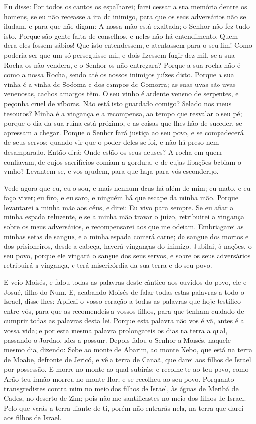 Eu disse: Por todos os cantos os espalharei; farei cessar a sua
memória dentre os homens, se eu não receasse a ira do
inimigo, para que os seus adversários não se iludam, e para que não
digam: A nossa mão está exaltada; o Senhor não fez tudo isto.
Porque são gente falta de conselhos, e neles não há
entendimento. Quem dera eles fossem sábios! Que isto
entendessem, e atentassem para o seu fim! Como poderia ser
que um só perseguisse mil, e dois fizessem fugir dez mil, se a sua
Rocha os não vendera, e o Senhor os não entregara? Porque a
sua rocha não é como a nossa Rocha, sendo até os nossos inimigos
juízes disto. Porque a sua vinha é a vinha de Sodoma e dos
campos de Gomorra; as suas uvas são uvas venenosas, cachos amargos
têm. O seu vinho é ardente veneno de serpentes, e peçonha
cruel de víboras. Não está isto guardado comigo? Selado nos
meus tesouros? Minha é a vingança e a recompensa, ao tempo
que resvalar o seu pé; porque o dia da sua ruína está próximo, e as
coisas que lhes hão de suceder, se apressam a chegar. Porque
o Senhor fará justiça ao seu povo, e se compadecerá de seus servos;
quando vir que o poder deles se foi, e não há preso nem desamparado.
Então dirá: Onde estão os seus deuses? A rocha em quem
confiavam, de cujos sacrifícios comiam a gordura, e de cujas
libações bebiam o vinho? Levantem-se, e vos ajudem, para que haja
para vós esconderijo.

Vede agora que eu, eu o sou, e mais nenhum deus há além de mim;
eu mato, e eu faço viver; eu firo, e eu saro, e ninguém há que
escape da minha mão. Porque levantarei a minha mão aos céus,
e direi: Eu vivo para sempre. Se eu afiar a minha espada
reluzente, e se a minha mão travar o juízo, retribuirei a vingança
sobre os meus adversários, e recompensarei aos que me odeiam.
Embriagarei as minhas setas de sangue, e a minha espada
comerá carne; do sangue dos mortos e dos prisioneiros, desde a
cabeça, haverá vinganças do inimigo. Jubilai, ó nações, o seu
povo, porque ele vingará o sangue dos seus servos, e sobre os seus
adversários retribuirá a vingança, e terá misericórdia da sua terra
e do seu povo.

E veio Moisés, e falou todas as palavras deste cântico aos
ouvidos do povo, ele e Josué, filho do Num. E, acabando
Moisés de falar todas estas palavras a todo o Israel,
disse-lhes: Aplicai o vosso coração a todas as palavras que
hoje testifico entre vós, para que as recomendeis a vossos filhos,
para que tenham cuidado de cumprir todas as palavras desta lei.
Porque esta palavra não vos é vã, antes é a vossa vida; e por
esta mesma palavra prolongareis os dias na terra a qual, passando o
Jordão, ides a possuir. Depois falou o Senhor a Moisés,
naquele mesmo dia, dizendo: Sobe ao monte de Abarim, ao monte
Nebo, que está na terra de Moabe, defronte de Jericó, e vê a terra
de Canaã, que darei aos filhos de Israel por possessão. E
morre no monte ao qual subirás; e recolhe-te ao teu povo, como Arão
teu irmão morreu no monte Hor, e se recolheu ao seu povo.
Porquanto transgredistes contra mim no meio dos filhos de
Israel, às águas de Meribá de Cades, no deserto de Zim; pois não me
santificastes no meio dos filhos de Israel. Pelo que verás a
terra diante de ti, porém não entrarás nela, na terra que darei aos
filhos de Israel.

